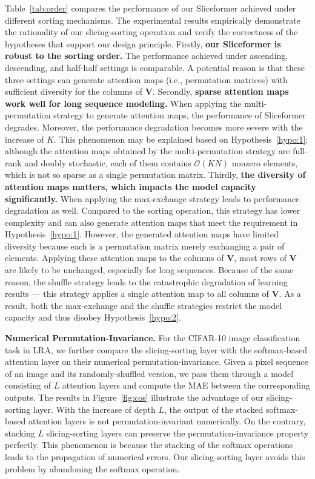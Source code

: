 Table~\ref{tab:order} compares the performance of our Sliceformer achieved under different sorting mechanisms. 
The experimental results empirically demonstrate the rationality of our slicing-sorting operation and verify the correctness of the hypotheses that support our design principle. 
Firstly, \textbf{our Sliceformer is robust to the sorting order.} 
The performance achieved under ascending, descending, and half-half settings is comparable.
A potential reason is that these three settings can generate attention maps (i.e., permutation matrices) with sufficient diversity for the columns of $\bm{V}$. 
Secondly, \textbf{sparse attention maps work well for long sequence modeling.} 
When applying the multi-permutation strategy to generate attention maps, the performance of Sliceformer degrades. 
Moreover, the performance degradation becomes more severe with the increase of $K$. 
This phenomenon may be explained based on Hypothesis~\ref{hypo:1}: although the attention maps obtained by the multi-permutation strategy are full-rank and doubly stochastic, each of them contains $\mathcal{O}(KN)$ nonzero elements, which is not so sparse as a single permutation matrix. 
Thirdly, \textbf{the diversity of attention maps matters, which impacts the model capacity significantly.}
When applying the max-exchange strategy leads to performance degradation as well. 
Compared to the sorting operation, this strategy has lower complexity and can also generate attention maps that meet the requirement in Hypothesis~\ref{hypo:1}.
However, the generated attention maps have limited diversity because each is a permutation matrix merely exchanging a pair of elements.
Applying these attention maps to the columns of $\bm{V}$, most rows of $\bm{V}$ are likely to be unchanged, especially for long sequences.
Because of the same reason, the shuffle strategy leads to the catastrophic degradation of learning results --- this strategy applies a single attention map to all columns of $\bm{V}$.
As a result, both the max-exchange and the shuffle strategies restrict the model capacity and thus disobey Hypothesis~\ref{hypo:2}.

\textbf{Numerical Permutation-Invariance.}
For the CIFAR-10 image classification task in LRA, we further compare the slicing-sorting layer with the softmax-based attention layer on their numerical permutation-invariance. 
Given a pixel sequence of an image and its randomly-shuffled version, we pass them through a model consisting of $L$ attention layers and compute the MAE between the corresponding outputs.
The results in Figure~\ref{fig:cos} illustrate the advantage of our slicing-sorting layer. 
With the increase of depth $L$, the output of the stacked softmax-based attention layers is not permutation-invariant numerically. 
On the contrary, stacking $L$ slicing-sorting layers can preserve the permutation-invariance property perfectly. 
This phenomenon is because the stacking of the softmax operations leads to the propagation of numerical errors. 
Our slicing-sorting layer avoids this problem by abandoning the softmax operation.

